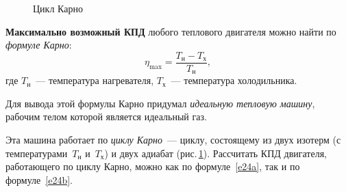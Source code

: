 \documentclass[main.tex]{subfiles}
\begin{document}
{%
\setlength\intextsep{0pt}
\begin{figure}
    \centering
    \caption{Цикл Карно}
    \label{fig:p87}
\end{figure}

\textbf{Максимально возможный КПД} любого теплового двигателя можно найти по \emph{формуле Карно}:
\begin{equation}
    \label{e24b}
    \eta_{\max}=\frac{T_\text{н}-T_\text{х}}{T_\text{н}},
\end{equation}
где $T_\text{н}$~--- температура нагревателя, $T_\text{х}$~--- температура холодильника.

Для вывода этой формулы Карно придумал \emph{идеальную тепловую машину}, рабочим телом которой является идеальный газ. 

Эта машина работает по \emph{циклу Карно}~--- циклу, состоящему из двух изотерм (с температурами~$T_\text{н}$ и~$T_\text{х}$) и двух адиабат (рис.\,\ref{fig:p87}). 
Рассчитать КПД двигателя, работающего по циклу Карно, можно как по формуле~\eqref{e24a}, так и по формуле~\eqref{e24b}.

}












 
\end{document}
